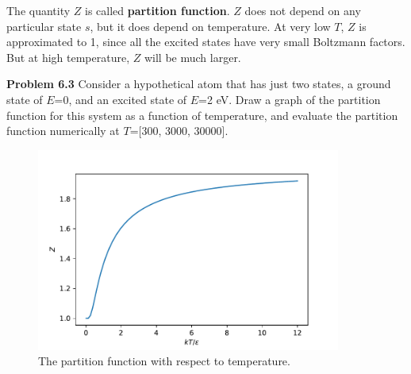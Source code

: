 The quantity $Z$ is called {\bf partition function}. $Z$ does not depend on any particular state $s$, but it does depend on temperature. At very 
low $T$, $Z$ is approximated to 1, since all the excited states have very small Boltzmann factors. But at high temperature, $Z$ will be much larger.

{\bf Problem 6.3} Consider a hypothetical atom that has just two states, a ground state of $E$=0, and an excited state of $E$=2 eV. Draw a graph of
 the partition function for this system as a function of temperature, and evaluate the partition function numerically at $T$=[300, 3000, 30000].

\begin{figure}[h]
\centering
\includegraphics[width=10cm]{imgs/Partition-2s}
\caption{The partition function with respect to temperature. }
\end{figure}

